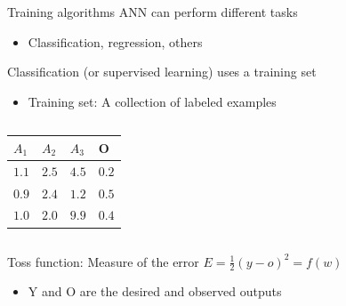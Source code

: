 \documentclass[10pt,compress]{beamer} %
\begin{document}
\begin{frame}{Training algorithms}
	ANN can perform different tasks
    \begin{itemize}
        \item Classification, regression, others
    \end{itemize}
    Classification (or supervised learning) uses a training set
    \begin{itemize}
        \item Training set: A collection of labeled examples
    \end{itemize}

    \begin{columns}
            

            \begin{table}[]
            \centering
            \begin{tabular}{|lll|l|}\hline
              $A_1$ & $A_2$ & $A_3$ & O \\
               \hline
              $1.1$ & $2.5$ & $4.5$ & $0.2$   \\
              $0.9$ & $2.4$ & $1.2$ & $0.5$   \\
              $1.0$ & $2.0$ & $9.9$ & $0.4$  \\\hline
            \end{tabular}
            \end{table}
    \end{columns}
    Toss function: Measure of the error $E = \frac{1}{2} (y-o)^2 = f(w)$
        \begin{itemize}
        \item Y and O are the desired and observed outputs
        \end{itemize}
\end{frame}
\end{document}
